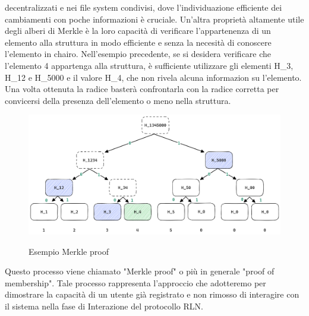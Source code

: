 decentralizzati e nei file system condivisi, dove l'individuazione efficiente dei cambiamenti con poche informazioni è
cruciale. Un'altra proprietà altamente utile degli alberi di Merkle è la loro capacità di verificare l'appartenenza di
un elemento alla struttura in modo efficiente e senza la necesità di conoscere l'elemento in chairo. Nell'esempio
precedente, se si desidera verificare che l'elemento 4 appartenga alla struttura, è sufficiente utilizzare gli elementi
H\_3, H\_12 e H\_5000 e il valore H\_4, che non rivela alcuna informazion su l'elemento. Una volta ottenuta la radice
basterà confrontarla con la radice corretta per convicersi della presenza dell'elemento o meno nella struttura.
\begin{figure}[H]
    \centering
    \includegraphics[width=14cm]{./chapters/2.rln-protocol/images/2.merkle_proof.png}
    \label{fig:merkle_proof}
    \captionsetup{justification=centering}
    \caption{Esempio Merkle proof}
\end{figure}
Questo processo viene chiamato "Merkle proof" o più in generale "proof of membership". Tale processo rappresenta
l'approccio che adotteremo per dimostrare la capacità di un utente già registrato e non rimosso di interagire con il
sistema nella fase di Interazione del protocollo RLN.

